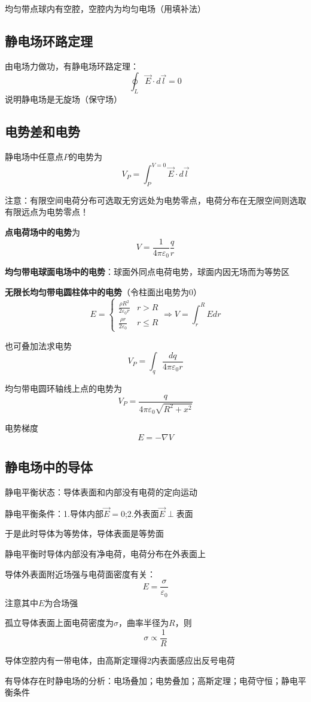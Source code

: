 \documentclass[10pt,a4paper]{article}
\begin{document}
均匀带点球内有空腔，空腔内为均匀电场（用填补法）
\subsection{静电场环路定理}
由电场力做功，有静电场环路定理：
\[\oint_L \vec{E}\cdot d\vec{l}=0\]
说明静电场是无旋场（保守场）
\subsection{电势差和电势}
静电场中任意点$P$的电势为
\[V_P=\int_P^{V=0}\vec{E}\cdot d\vec{l}\]

注意：有限空间电荷分布可选取无穷远处为电势零点，电荷分布在无限空间则选取有限远点为电势零点！

\textbf{点电荷场中的电势}为
\[V=\frac{1}{4\pi\varepsilon_0}\frac{q}{r}\]

\textbf{均匀带电球面电场中的电势}：球面外同点电荷电势，球面内因无场而为等势区

\textbf{无限长均匀带电圆柱体中的电势}（令柱面出电势为0）
\[E=
\begin{cases}
    \frac{\rho R^2}{2\varepsilon_0 r} & r>R\\
    \frac{\rho r}{2\varepsilon_0} & r\leq R
\end{cases}
\Rightarrow
V=\int_r^R E dr
\]

也可叠加法求电势
\[V_P=\int_q\frac{dq}{4\pi\varepsilon_0 r}\]


均匀带电圆环轴线上点的电势为
\[V_P=\frac{q}{4\pi\varepsilon_0\sqrt{R^2+x^2}}\]

电势梯度
\[E=-\nabla V\]
\subsection{静电场中的导体}
静电平衡状态：导体表面和内部没有电荷的定向运动

静电平衡条件：1.导体内部$\vec{E}=0$;2.外表面$\vec{E}\perp $表面

于是此时导体为等势体，导体表面是等势面

静电平衡时导体内部没有净电荷，电荷分布在外表面上

导体外表面附近场强与电荷面密度有关：
\[\boxed{E=\frac{\sigma}{\varepsilon_0}}\]
注意其中$E$为合场强

孤立导体表面上面电荷密度为$\sigma$，曲率半径为$R$，则
\[\boxed{\sigma \propto \frac{1}{R}}\]

导体空腔内有一带电体，由高斯定理得2内表面感应出反号电荷

有导体存在时静电场的分析：电场叠加；电势叠加；高斯定理；电荷守恒；静电平衡条件
\end{document}

